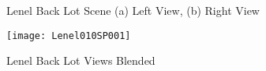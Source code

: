 \begin{figure}
\centering
{}
\caption{Lenel Back Lot Scene (a) Left View, (b) Right View}
\label{Lenel10Images}
\end{figure}

\begin{figure}
\centering
\texttt{[image: Lenel010SP001]}
\caption{Lenel Back Lot Views Blended}
\label{Lenel10Stitched}
\end{figure}



